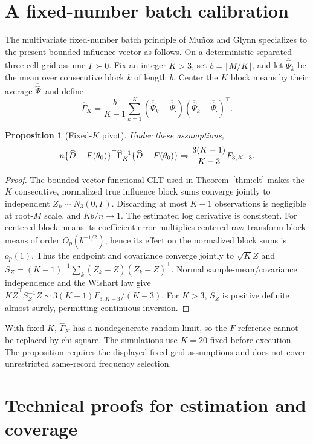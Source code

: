 \documentclass[11pt,a4paper]{article}
\newtheorem{proposition}[theorem]{Proposition}
\theoremstyle{remark}\newtheorem{remark}[theorem]{Remark}
\begin{document}
\section{A fixed-number batch calibration}\label{app:calibration}
The multivariate fixed-number batch principle of Mu\~noz and Glynn \cite[Section 2.2, Example 1]{mg} specializes to the present bounded influence vector as follows.
On a deterministic separated three-cell grid assume $\Gamma\succ0$. Fix an integer $K>3$, set $b=\lfloor M/K\rfloor$, and let $\overline{\widehat\Psi}_k$ be the mean over consecutive block $k$ of length $b$. Center the $K$ block means by their average $\overline{\widehat\Psi}_{\cdot}$ and define
\[
\widehat\Gamma_{K}=\frac{b}{K-1}\sum_{k=1}^K
(\overline{\widehat\Psi}_k-\overline{\widehat\Psi}_{\cdot})
(\overline{\widehat\Psi}_k-\overline{\widehat\Psi}_{\cdot})^\top.
\]
\begin{proposition}[Fixed-$K$ pivot]\label{prop:batch}
Under these assumptions,
\[
n\{\widehat D-F(\theta_0)\}^\top\widehat\Gamma_K^{-1}\{\widehat D-F(\theta_0)\}
\Rightarrow \frac{3(K-1)}{K-3}F_{3,K-3}.
\]
\end{proposition}
\begin{proof}
The bounded-vector functional CLT used in Theorem~\ref{thm:clt} makes the $K$ consecutive, normalized true influence block sums converge jointly to independent $Z_k\sim N_3(0,\Gamma)$. Discarding at most $K-1$ observations is negligible at root-$M$ scale, and $Kb/n\to1$. The estimated log derivative is consistent. For centered block means its coefficient error multiplies centered raw-transform block means of order $O_p(b^{-1/2})$, hence its effect on the normalized block sums is $o_p(1)$. Thus the endpoint and covariance converge jointly to
$\sqrt K\bar Z$ and $S_Z=(K-1)^{-1}\sum_k(Z_k-\bar Z)(Z_k-\bar Z)^\top$.
Normal sample-mean/covariance independence and the Wishart law give
$K\bar Z^\top S_Z^{-1}\bar Z\sim3(K-1)F_{3,K-3}/(K-3)$.
For $K>3$, $S_Z$ is positive definite almost surely, permitting continuous inversion.
\end{proof}
With fixed $K$, $\widehat\Gamma_K$ has a nondegenerate random limit, so the $F$ reference cannot be replaced by chi-square. The simulations use $K=20$ fixed before execution. The proposition requires the displayed fixed-grid assumptions and does not cover unrestricted same-record frequency selection.

\section{Technical proofs for estimation and coverage}\label{app:technical}
\end{document}
